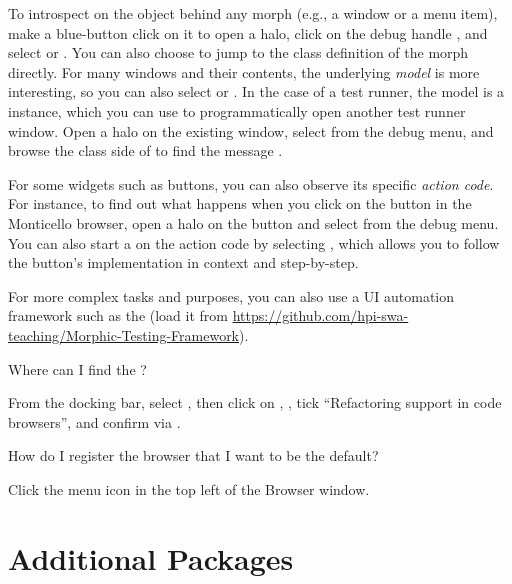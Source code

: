 \documentclass[a4paper,10pt,twoside]{book}
\begin{document}
{To introspect on the object behind any morph (e.g., a window or a menu item), make a blue-button click on it to open a halo, click on the debug handle \debugHandle{}, and select  or .
You can also choose  to jump to the class definition of the morph directly.
For many windows and their contents, the underlying \emph{model} is more interesting, so you can also select  or .
In the case of a test runner, the model is a  instance, which you can use to programmatically open another test runner window.
Open a halo on the existing window, select  from the debug menu, and browse the class side of  to find the message .

For some widgets such as buttons, you can also observe its specific \emph{action code}.
For instance, to find out what happens when you click on the  button in the Monticello browser, open a halo on the button and select  from the debug menu.
You can also start a  on the action code by selecting , which allows you to follow the button's implementation in context and step-by-step.

For more complex  tasks and  purposes, you can also use a UI automation framework such as the  (load it from \url{https://github.com/hpi-swa-teaching/Morphic-Testing-Framework}).

\begin{faq}
Where can I find the ?
\end{faq}
\answer
From the docking bar, select , then click on , , tick ``Refactoring support in code browsers'', and confirm via .

\begin{faq}
How do I register the browser that I want to be the default?
\end{faq}
\answer
Click the menu icon in the top left of the Browser window.

\section{Additional Packages}

}
\end{document}
